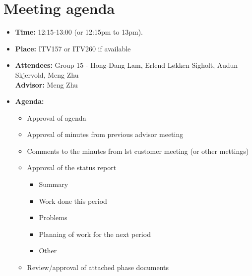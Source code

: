 \documentclass[12pt, a4paper]{article}
\begin{document}
\section{Meeting agenda }
\begin{itemize}
\item \textbf{Time:} 12:15-13:00 (or 12:15pm to 13pm).
\item \textbf{Place:} ITV157 or ITV260 if available\\
\item \textbf{Attendees:} Group 15 - Hong-Dang Lam, Erlend Løkken Sigholt, Audun Skjervold, Meng Zhu \\ \textbf{Advisor:} Meng Zhu
\item \textbf{Agenda:} 
	\begin{itemize}
	\item Approval of agenda
	\item Approval of minutes from previous advisor meeting
	\item Comments to the minutes from lst customer meeting (or other mettings)
	\item Approval of the status report
		\begin{itemize}
		\item Summary
		\item Work done this period
		\item Problems
		\item Planning of work for the next period
		\item Other
	\end{itemize}
	\item Review/approval of attached phase documents
	\end{itemize}
\end{itemize}
\end{document}
